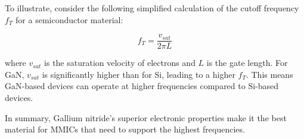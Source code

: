 To illustrate, consider the following simplified calculation of the cutoff frequency \( f_T \) for a semiconductor material:

\[
f_T = \frac{v_{sat}}{2\pi L}
\]

where \( v_{sat} \) is the saturation velocity of electrons and \( L \) is the gate length. For GaN, \( v_{sat} \) is significantly higher than for Si, leading to a higher \( f_T \). This means GaN-based devices can operate at higher frequencies compared to Si-based devices.

In summary, Gallium nitride's superior electronic properties make it the best material for MMICs that need to support the highest frequencies.

